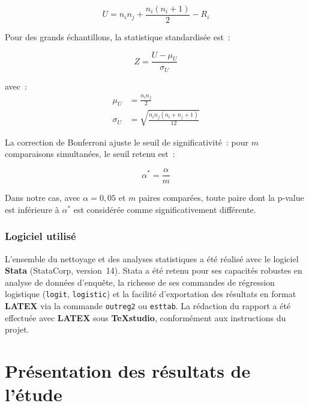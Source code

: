\documentclass[
12pt,          %
a4paper,       %
oneside,      %
openright      %
]{report}          %
\begin{document}
		\begin{equation}
			U = n_i n_j +
			\frac{n_i(n_i + 1)}{2} - R_i
		\end{equation}
		
		
		\medskip
		\noindent Pour des grands \'echantillons, la statistique
		standardis\'ee est~:
		
		\begin{equation}
			Z = \frac{U - \mu_U}{\sigma_U}
		\end{equation}
		
		\noindent avec~:
		\begin{align}
			\mu_U    &= \frac{n_i n_j}{2} \\[6pt]
			\sigma_U &= \sqrt{\frac{n_i n_j (n_i + n_j + 1)}{12}}
		\end{align}
		
		\medskip
		\noindent La correction de Bonferroni ajuste le seuil
		de significativit\'e~: pour $m$ comparaisons
		simultan\'ees, le seuil retenu est~:
		
		\begin{equation}
			\alpha^* = \frac{\alpha}{m}
		\end{equation}
		
		\noindent Dans notre cas, avec $\alpha = 0{,}05$ et
		$m$ paires compar\'ees, toute paire dont la p-value
		est inf\'erieure \`a $\alpha^*$ est consid\'er\'ee
		comme significativement diff\'erente.
		
		
		\subsection{Logiciel utilisé}
		
		L'ensemble du nettoyage et des analyses statistiques a été réalisé avec le logiciel
		\textbf{Stata} (StataCorp, version~14). Stata a été retenu pour ses capacités robustes
		en analyse de données d'enquête, la richesse de ses commandes de régression logistique
		(\texttt{logit}, \texttt{logistic}) et la facilité d'exportation des résultats en
		format \textbf{LATEX} via la commande \texttt{outreg2} ou \texttt{esttab}. La rédaction du
		rapport a été effectuée avec \textbf{LATEX} sous \textbf{TeXstudio}, conformément aux
		instructions du projet.
	
		
		
		\chapter{Présentation des résultats	de l’étude}
		\label{chap:resultats}
		
\end{document}

